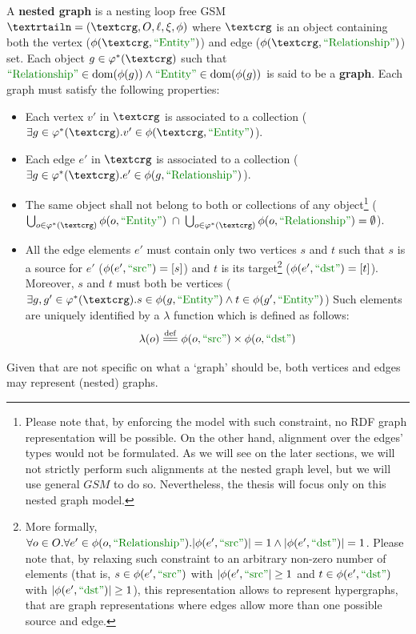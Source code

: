 \begin{definition}
	A \textbf{nested graph} is a nesting loop free GSM $\fullnested$  where $\ngraph$ is an object containing both the vertex ($\phi(\ngraph,\ONTA)$) and edge ($\phi(\ngraph,\RELA)$) set. Each object $g\in \varphi^*(\ngraph)$ such that $\RELA\in\dom(\phi(g))\wedge \ONTA\in\dom(\phi(g))$ is said to be a \textbf{graph}. Each graph must satisfy the following properties:
	\begin{itemize}
		\item Each vertex $v'$ in $\ngraph$ is associated to a \ONTA collection ($\exists g\in\varphi^*(\ngraph). v'\in\phi(\ngraph,\ONTA)$).
		\item Each edge $e'$ in $\ngraph$ is associated to a \RELA collection ($\exists g\in\varphi^*(\ngraph).e'\in\phi(g,\RELA)$).
		\item  The same object shall not belong to both \ONTA or \RELA collections of any object\footnote{Please note that, by enforcing the model with such constraint, no RDF graph representation will be possible. On the other hand, alignment over the edges' types would not be formulated. As we will see on the later sections, we will not strictly perform such alignments at the nested graph level, but we will use general $GSM$ to do so. Nevertheless, the thesis will focus only on this nested graph model.} ($\bigcup_{o\in \varphi^*(\ngraph)}\phi(o,\ONTA)\;\cap\; \bigcup_{o\in \varphi^*(\ngraph)}\phi(o,\RELA)=\emptyset$).
		\item All the edge elements $e'$ must contain only two vertices $s$ and $t$ such that $s$ is a source for $e'$ ($\phi(e',\SRC)=[s]$) and $t$ is its target\footnote{More formally, $\forall o\in O.\forall e'\in\phi(o,\RELA).|\phi(e',\SRC)|=1\wedge |\phi(e',\DST)|=1$. Please note that, by relaxing such constraint to an arbitrary non-zero number of elements (that is, $s\in\phi(e',\SRC)$ with $|\phi(e',\SRC|\geq 1$ and $t\in\phi(e',\DST)$ with $|\phi(e',\DST)|\geq 1$), this representation allows to represent hypergraphs, that are graph representations where edges allow more than one possible source and edge.} ($\phi(e',\DST)=[t]$). Moreover, $s$ and $t$ must both be vertices ($\exists g,g'\in\varphi^*(\ngraph). s\in\phi(g,\ONTA)\wedge t\in\phi(g',\ONTA)$) Such elements are uniquely identified by a $\lambda$ function which is defined as follows:
		\[\lambda(o)\eqdef \phi(o,\SRC)\times\phi(o,\DST)\]
\end{itemize}
Given that are not specific on what a `graph' should be, both vertices and edges may represent (nested) graphs.
\end{definition}


